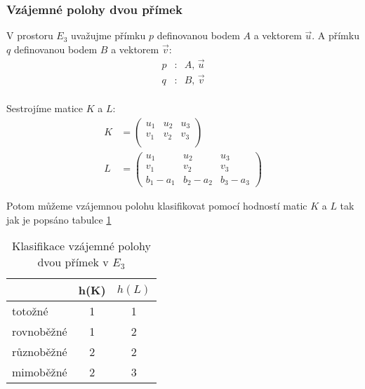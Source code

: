 \subsubsection{Vzájemné polohy dvou přímek}
V prostoru $E_3$ uvažujme přímku $p$ definovanou bodem $A$ a vektorem $\vec{u}$. A
přímku $q$ definovanou bodem $B$ a vektorem $\vec{v}$:
\begin{align*}
    p&: \;\; A,\,\vec{u}\\
    q&: \;\; B,\,\vec{v}\\
\end{align*}

Sestrojíme matice $K$ a $L$:
\begin{align*}
    K &=
    \begin{pmatrix}
        u_1 & u_2 & u_3\\
        v_1 & v_2 & v_3\\
    \end{pmatrix}\\
    L &=
    \begin{pmatrix}
        u_1 & u_2 & u_3\\
        v_1 & v_2 & v_3\\
        b_1 - a_1 & b_2 - a_2 &  b_3 - a_3
    \end{pmatrix}
\end{align*}

Potom můžeme vzájemnou polohu klasifikovat pomocí hodností matic $K$ a $L$ tak jak je popsáno
tabulce \ref{tab:roviny_poloha}
\begin{table}[h]
    \centering
    \begin{tabular}{|l|c|c|}
    \hline
     & \multicolumn{1}{l|}{h(K)} & \multicolumn{1}{l|}{$h(L)$} \\ \hline
    totožné & 1 & 1 \\ \hline
    rovnoběžné & 1 & 2 \\ \hline
    různoběžné & 2 & 2 \\ \hline
    mimoběžné & 2 & 3 \\ \hline
    \end{tabular}
    \caption{Klasifikace vzájemné polohy dvou přímek v $E_3$}
    \label{tab:roviny_poloha}
\end{table}

